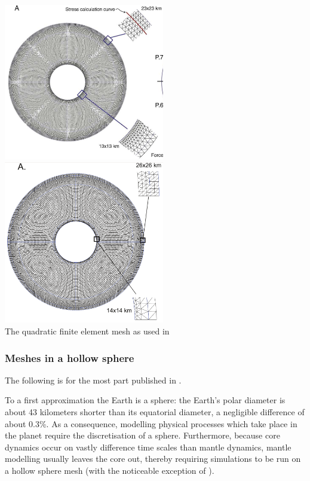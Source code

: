 \begin{center}
\includegraphics[width=7cm]{images/meshes/brhv08}
\includegraphics[width=7cm]{images/meshes/brva07a}\\
{\captionfont The quadratic finite element mesh as used in \cite{brhv08,brva07a}}
\end{center}


\subsubsection{Meshes in a hollow sphere}

The following is for the most part published in \cite{thie18}.

To a first approximation the Earth is a sphere: the Earth's polar diameter is about 43 kilometers shorter 
than its equatorial diameter, a negligible difference of about 0.3\%. As a consequence, modelling physical processes 
which take place in the planet require the discretisation of a sphere. 
Furthermore, because core dynamics occur on vastly difference time scales than mantle dynamics, mantle 
modelling usually leaves the core out, thereby requiring simulations to be run on a hollow sphere mesh
(with the noticeable exception of \cite{geyu07}).

